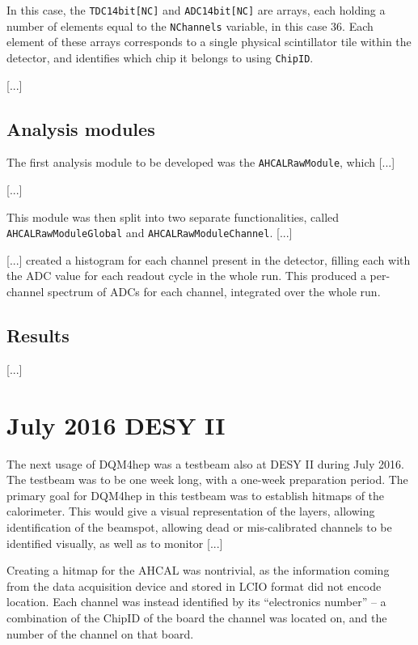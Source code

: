In this case, the \texttt{TDC14bit[NC]} and \texttt{ADC14bit[NC]} are arrays, each holding a number of elements equal to the \texttt{NChannels} variable, in this case 36. Each element of these arrays corresponds to a single physical scintillator tile within the detector, and identifies which chip it belongs to using \texttt{ChipID}. 

[...]

\subsection{Analysis modules}
The first analysis module to be developed was the \texttt{AHCALRawModule}, which [...]

[...]

This module was then split into two separate functionalities, called \texttt{AHCALRawModuleGlobal} and \texttt{AHCALRawModuleChannel}. [...]

[...] created a histogram for each channel present in the detector, filling each with the ADC value for each readout cycle in the whole run. This produced a per-channel spectrum of ADCs for each channel, integrated over the whole run. %

\subsection{Results} %

[...]

\section{July 2016 DESY II}
The next usage of DQM4hep was a testbeam also at DESY II during July 2016. The testbeam was to be one week long, with a one-week preparation period. The primary goal for DQM4hep in this testbeam was to establish hitmaps of the calorimeter. This would give a visual representation of the layers, allowing identification of the beamspot, allowing dead or mis-calibrated channels to be identified visually, as well as to monitor [...]

Creating a hitmap for the AHCAL was nontrivial, as the information coming from the data acquisition device and stored in LCIO format did not encode location. Each channel was instead identified by its ``electronics number'' -- a combination of the ChipID of the board the channel was located on, and the number of the channel on that board.

